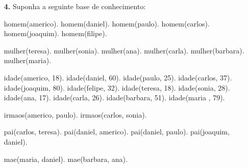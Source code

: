 \documentclass[10pt, twoside]{article}          %
\newenvironment{proof*}[1][proof*]              %
  {\proof[#1]\vspace{0.5em}\vspace*{-\baselineskip}
  \hspace{\parindent}\leftskip=.5cm\rightskip=.5cm}
  {\vspace*{-1.5\baselineskip}
  
  \rightskip=0cm\endproof}
\newenvironment{enumerate*}[1][,]               %
  {\begin{enumerate}[
    itemindent=\leftskip+\parindent, labelindent=\leftskip+\parindent, 
    wide, topsep=0pt,
    label={\bfseries\arabic*.}, labelwidth=10pt, labelindent=\leftskip+\parindent, 
    leftmargin=\leftskip, rightmargin=\rightskip,
    #1
  ]}
  {\end{enumerate}}
\begin{document}
\begin{multicols*}{2}
\begin{enumerate}
\begin{proof*}[\unskip\nopunct]
\begin{enumerate}
    \end{enumerate}
  \end{proof*}

  \item[\textbf{4.}] Suponha a seguinte base de conhecimento:
  \begin{pseudocode}[gobble=4]
    homem(americo).
    homem(daniel).
    homem(paulo).
    homem(carlos).
    homem(joaquim).
    homem(filipe).

    mulher(teresa).
    mulher(sonia).
    mulher(ana).
    mulher(carla).
    mulher(barbara).
    mulher(maria).

    idade(americo, 18).
    idade(daniel, 60).
    idade(paulo, 25).
    idade(carlos, 37).
    idade(joaquim, 80).
    idade(felipe, 32).
    idade(teresa, 18).
    idade(sonia, 28).
    idade(ana, 17).
    idade(carla, 26).
    idade(barbara, 51).
    idade(maria , 79).

    irmaos(americo, paulo).
    irmaos(carlos, sonia).

    pai(carlos, teresa).
    pai(daniel, americo).
    pai(daniel, paulo).
    pai(joaquim, daniel).

    mae(maria, daniel).
    mae(barbara, ana).


\end{pseudocode}
\end{enumerate}
\end{multicols*}
\end{document}
